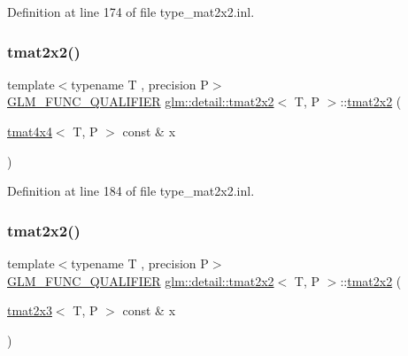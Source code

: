Definition at line 174 of file type\+\_\+mat2x2.\+inl.

\mbox{\label{structglm_1_1detail_1_1tmat2x2_ad46d070d32a5455eddf99fea687b488d}} 
\subsubsection{\texorpdfstring{tmat2x2()}{tmat2x2()}\hspace{0.1cm}{\footnotesize\ttfamily [12/22]}}
{\footnotesize\ttfamily template$<$typename T , precision P$>$ \\
\hyperlink{setup_8hpp_a33fdea6f91c5f834105f7415e2a64407}{G\+L\+M\+\_\+\+F\+U\+N\+C\+\_\+\+Q\+U\+A\+L\+I\+F\+I\+ER} \hyperlink{structglm_1_1detail_1_1tmat2x2}{glm\+::detail\+::tmat2x2}$<$ T, P $>$\+::\hyperlink{structglm_1_1detail_1_1tmat2x2}{tmat2x2} (\begin{DoxyParamCaption}\item[{\hyperlink{structglm_1_1detail_1_1tmat4x4}{tmat4x4}$<$ T, P $>$ const \&}]{x }\end{DoxyParamCaption})\hspace{0.3cm}{\ttfamily [explicit]}}



Definition at line 184 of file type\+\_\+mat2x2.\+inl.

\mbox{\label{structglm_1_1detail_1_1tmat2x2_abe06c612421c4e601074d1e66772ae6a}} 
\subsubsection{\texorpdfstring{tmat2x2()}{tmat2x2()}\hspace{0.1cm}{\footnotesize\ttfamily [13/22]}}
{\footnotesize\ttfamily template$<$typename T , precision P$>$ \\
\hyperlink{setup_8hpp_a33fdea6f91c5f834105f7415e2a64407}{G\+L\+M\+\_\+\+F\+U\+N\+C\+\_\+\+Q\+U\+A\+L\+I\+F\+I\+ER} \hyperlink{structglm_1_1detail_1_1tmat2x2}{glm\+::detail\+::tmat2x2}$<$ T, P $>$\+::\hyperlink{structglm_1_1detail_1_1tmat2x2}{tmat2x2} (\begin{DoxyParamCaption}\item[{\hyperlink{structglm_1_1detail_1_1tmat2x3}{tmat2x3}$<$ T, P $>$ const \&}]{x }\end{DoxyParamCaption})\hspace{0.3cm}{\ttfamily [explicit]}}




